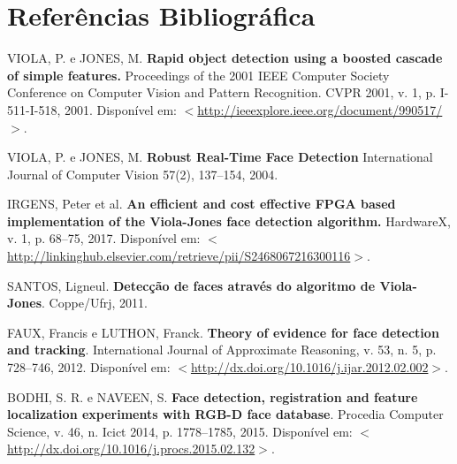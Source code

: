 \documentclass[12pt,a4paper]{article}
\begin{document}
\newpage
\section{Referências Bibliográfica}
\noindent VIOLA, P. e JONES, M. \textbf{Rapid object detection using a boosted cascade of simple features.} Proceedings of the 2001 IEEE Computer Society Conference on Computer Vision and Pattern Recognition. CVPR 2001, v. 1, p. I-511-I-518, 2001. Disponível em: $<$\url{http://ieeexplore.ieee.org/document/990517/}$>$.\\\vspace{0.2cm}

\noindent VIOLA, P. e JONES, M. \textbf{Robust Real-Time Face
Detection}  International Journal of Computer Vision
57(2), 137–154, 2004.\\\vspace{0.2cm}


\noindent IRGENS, Peter et al. \textbf{An efficient and cost effective FPGA based implementation of the Viola-Jones face detection algorithm.} HardwareX, v. 1, p. 68–75, 2017. Disponível em: $<$\url{http://linkinghub.elsevier.com/retrieve/pii/S2468067216300116}$>$.\\\vspace{0.2cm}

\noindent SANTOS, Ligneul. \textbf{Detecção de faces através do algoritmo de Viola-Jones}. Coppe/Ufrj, 2011.\\\vspace{0.2cm}

\noindent FAUX, Francis e LUTHON, Franck. \textbf{Theory of evidence for face detection and tracking}. International Journal of Approximate Reasoning, v. 53, n. 5, p. 728–746, 2012. Disponível em: $<$\url{http://dx.doi.org/10.1016/j.ijar.2012.02.002}$>$.\\\vspace{0.2cm}

\noindent BODHI, S. R. e NAVEEN, S. \textbf{Face detection, registration and feature localization experiments with RGB-D face database}. Procedia Computer Science, v. 46, n. Icict 2014, p. 1778–1785, 2015. Disponível em: $<$\url{http://dx.doi.org/10.1016/j.procs.2015.02.132}$>$.
\end{document}
